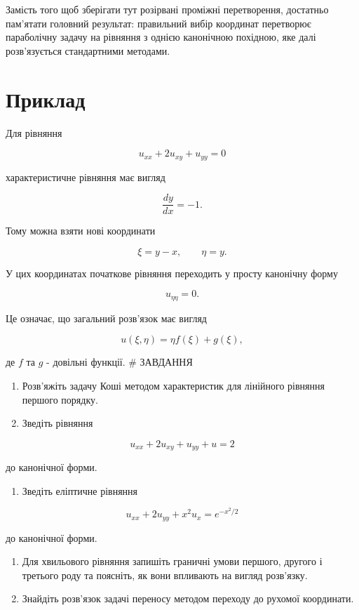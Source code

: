 \documentclass[
  ukrainian,
]{article}
\providecommand{\tightlist}{%
  \setlength{\itemsep}{0pt}\setlength{\parskip}{0pt}}
\begin{document}
Замість того щоб зберігати тут розірвані проміжні перетворення,
достатньо пам'ятати головний результат: правильний вибір координат
перетворює параболічну задачу на рівняння з однією канонічною похідною,
яке далі розв'язується стандартними методами.

\section{Приклад}\label{ux43fux440ux438ux43aux43bux430ux434}

Для рівняння

\[
u_{xx} + 2u_{xy} + u_{yy} = 0
\]

характеристичне рівняння має вигляд

\[
\frac{dy}{dx} = -1.
\]

Тому можна взяти нові координати

\[
\xi = y - x, \qquad \eta = y.
\]

У цих координатах початкове рівняння переходить у просту канонічну форму

\[
u_{\eta\eta} = 0.
\]

Це означає, що загальний розв'язок має вигляд

\[
u(\xi,\eta) = \eta f(\xi) + g(\xi),
\]

де \(f\) та \(g\) - довільні функції. \# ЗАВДАННЯ

\begin{enumerate}
\def\labelenumi{\arabic{enumi}.}
\item
  Розв'яжіть задачу Коші методом характеристик для лінійного рівняння
  першого порядку.
\item
  Зведіть рівняння
\end{enumerate}

\[
u_{xx} + 2u_{xy} + u_{yy} + u = 2
\]

до канонічної форми.

\begin{enumerate}
\def\labelenumi{\arabic{enumi}.}
\setcounter{enumi}{2}
\tightlist
\item
  Зведіть еліптичне рівняння
\end{enumerate}

\[
u_{xx} + 2u_{yy} + x^2u_x = e^{-x^2/2}
\]

до канонічної форми.

\begin{enumerate}
\def\labelenumi{\arabic{enumi}.}
\setcounter{enumi}{3}
\item
  Для хвильового рівняння запишіть граничні умови першого, другого і
  третього роду та поясніть, як вони впливають на вигляд розв'язку.
\item
  Знайдіть розв'язок задачі переносу методом переходу до рухомої
  координати.
\end{enumerate}
\end{document}
